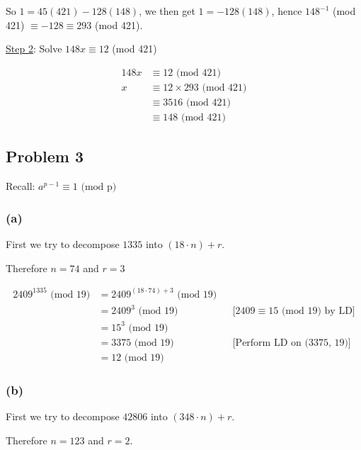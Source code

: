 \documentclass[10pt]{article}
\begin{document}
\spacing
\noindent
So $1 = 45(421) - 128(148)$, we then get $1 = -128(148)$, 
hence $148^{-1}$ (mod 421) $\equiv -128 \equiv 293$ (mod 421).
\spacing

\noindent
\underline{Step 2}: Solve $148x \equiv 12$ (mod 421)

\begin{align*}
  148x &\equiv 12 \text{ (mod 421)} \\
     x &\equiv 12 \times 293 \text{ (mod 421)} \\
       &\equiv 3516 \text{ (mod 421)} \\
       &\equiv 148 \text{ (mod 421)}
\end{align*}

\newpage
\subsection*{Problem 3}

Recall: $a^{p - 1} \equiv 1 \text{ (mod p)}$

\subsubsection*{(a)}

First we try to decompose $1335$ into $(18 \cdot n) + r$.
\spacing

\spacing

\noindent
Therefore $n = 74$ and $r = 3$

\begin{align*}
  2409^{1335} \text{ (mod 19)} &= 2409^{(18 \cdot 74) + 3} \text{ (mod 19)} \\
    &= 2409^3 \text{ (mod 19)} && \text{[$2409 \equiv 15$ (mod 19) by LD]} \\
    &= 15^3 \text{ (mod 19)} \\
    &= 3375 \text{ (mod 19)} && \text{[Perform LD on (3375, 19)]} \\
    &= 12 \text{ (mod 19)}
\end{align*}

\subsubsection*{(b)}

First we try to decompose $42806$ into $(348 \cdot n) + r$.
\spacing

\spacing

\noindent
Therefore $n = 123$ and $r = 2$.
\end{document}
